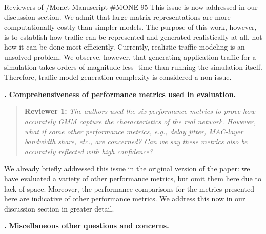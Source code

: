 \documentclass{letter}
\newcounter{topic}
\newcommand{\topic}[1]{
\addtocounter{topic}{1}
\textbf{\arabic{topic}. #1}
}
\newenvironment{reviewer}[1]%
{\begin{quote}\textbf{Reviewer #1:} \it}{\end{quote}}
\begin{document}
\begin{letter}{Reviewers of /Monet Manuscript \#MONE-95}
This issue is now addressed in our discussion section.
We admit that large matrix representations are more computationally costly than simpler models.
The purpose of this work, however, is to establish how traffic can be represented and generated realistically at all, not how it can be done most efficiently.
Currently, realistic traffic modeling is an unsolved problem.
We observe, however, that generating application traffic for a simulation takes orders of magnitude less -time than running the simulation itself.
Therefore, traffic model generation complexity is considered a non-issue.

\topic{Comprehensiveness of performance metrics used in evaluation.}

\begin{reviewer}{1}
The authors used the six performance metrics to prove how accurately GMM capture the characteristics of the real network. However, what if some other performance metrics, e.g., delay jitter, MAC-layer bandwidth share, etc., are concerned? Can we say these metrics also be accurately reflected with high confidence?
\end{reviewer}

We already briefly addressed this issue in the original version of the paper:
we have evaluated a variety of other performance metrics, but omit them here due to lack of space.
Moreover, the performance comparisons for the metrics presented here are indicative of other performance metrics.
We address this now in our discussion section in greater detail.

\topic{Miscellaneous other questions and concerns.}


\end{letter}
\end{document}
